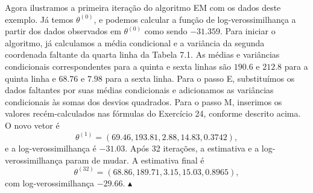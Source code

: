 Agora ilustramos a primeira iteração do algoritmo EM com os dados deste exemplo. Já temos $\theta^{(0)}$, e podemos calcular a função de log-verossimilhança a partir dos dados observados em $\theta^{(0)}$ como sendo $-31.359$. Para iniciar o algoritmo, já calculamos a média condicional e a variância da segunda coordenada faltante da quarta linha da Tabela 7.1. As médias e variâncias condicionais correspondentes para a quinta e sexta linhas são $190.6$ e $212.8$ para a quinta linha e $68.76$ e $7.98$ para a sexta linha. Para o passo E, substituímos os dados faltantes por suas médias condicionais e adicionamos as variâncias condicionais às somas dos desvios quadrados. Para o passo M, inserimos os valores recém-calculados nas fórmulas do Exercício 24, conforme descrito acima. O novo vetor é
$$ \theta^{(1)} = (69.46, 193.81, 2.88, 14.83, 0.3742), $$
e a log-verossimilhança é $-31.03$. Após 32 iterações, a estimativa e a log-verossimilhança param de mudar. A estimativa final é
$$ \theta^{(32)} = (68.86, 189.71, 3.15, 15.03, 0.8965), $$
com log-verossimilhança $-29.66$. $\blacktriangle$

